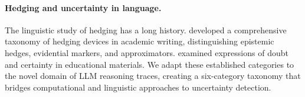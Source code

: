 \paragraph{Hedging and uncertainty in language.}
The linguistic study of hedging has a long history. \citet{hyland1998hedging} developed a comprehensive taxonomy of hedging devices in academic writing, distinguishing epistemic hedges, evidential markers, and approximators. \citet{holmes1988doubt} examined expressions of doubt and certainty in educational materials. We adapt these established categories to the novel domain of LLM reasoning traces, creating a six-category taxonomy that bridges computational and linguistic approaches to uncertainty detection.
